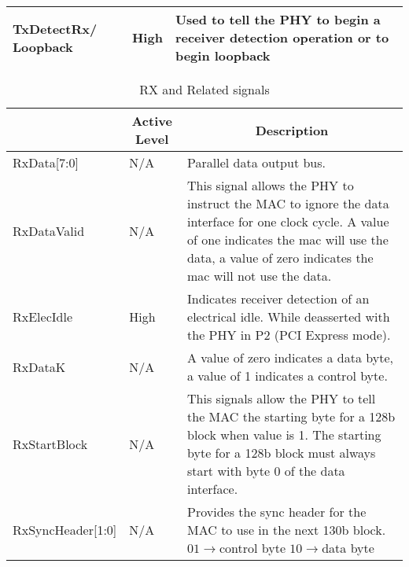 \begin{table}[H]
\begin{tabular}{ |m{26mm}|m{10mm}|m{60mm}|  }
\\
\hline


TxDetectRx/ \newline Loopback
& 
High
&
Used to tell the PHY to begin a receiver detection
operation or to begin loopback \\
\hline



\end{tabular}

\end{table}


\begin{table}[H]
    \caption{RX and Related signals}
    \label{tab:p2}
    \centering
  \begin{tabular}{ |m{26mm}|m{10mm}|m{60mm}|  }
\hline
\rowcolor{Gray}
\multicolumn{1}{|c|}{\textbf{Name} } 
& \multicolumn{1}{|c|}{\textbf{Active Level}} 
& \multicolumn{1}{|c|}{\textbf{Description}}\\
\hline
RxData[7:0] 
& 
N/A
&
Parallel data output bus. \\
\hline

RxDataValid
& 
N/A
&
This signal allows the PHY to instruct the MAC to ignore the data interface \newline
for one clock cycle. A value of one \newline
indicates the mac will use the data, a \newline
value of zero indicates the mac will not \newline
use the data. \\
\hline

RxElecIdle
& 
High
&
Indicates receiver detection of an
electrical idle. While deasserted
with the PHY in P2 (PCI Express
mode).
\\
\hline


RxDataK
& 
N/A
&
A value of zero indicates a
data byte, a value of 1 indicates a
control byte.\\
\hline


RxStartBlock
& 
N/A
&
This signals allow the PHY to tell
the MAC the starting byte for a 128b
block when value is 1. The starting byte for a 128b
block must always start with byte 0 of
the data interface. \\
\hline



RxSyncHeader[1:0]
& 
N/A
&

Provides the sync header for
the MAC to use in the next 130b block.
\newline \newline
$ 01 \longrightarrow $control byte \newline
$ 10 \longrightarrow $data byte


\end{tabular}
\end{table}
